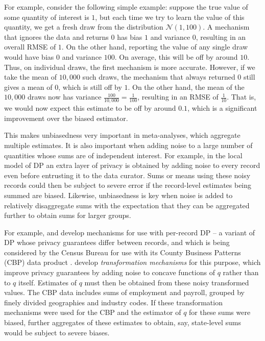 \documentclass[11pt]{article}
\begin{document}
For example, consider the following simple example: suppose the true value of some quantity of interest is $1$, but each time we try to learn the value of this quantity, we get a fresh draw from the distribution $\mathcal{N}(1,100)$. A mechanism that ignores the data and returns $0$ has bias $1$ and variance $0$, resulting in an overall RMSE of $1$. On the other hand, reporting the value of any single draw would have bias $0$ and variance $100$. On average, this will be off by around $10$. Thus, on individual draws, the first mechanism is more accurate. However, if we take the mean of $10,000$ such draws, the mechanism that always returned $0$ still gives a mean of $0$, which is still off by $1$. On the other hand, the mean of the $10,000$ draws now has variance $\frac{100}{10,000} = \frac{1}{100}$, resulting in an RMSE of $\frac{1}{10}$. That is, we would now expect this estimate to be off by around $0.1$, which is a significant improvement over the biased estimator.

This makes unbiasedness very important in meta-analyses, which aggregate multiple estimates. It is also important when adding noise to a large number of quantities whose sums are of independent interest. For example, in the local model of DP an extra layer of privacy is obtained by adding noise to every record even before entrusting it to the data curator. Sums or means using these noisy records could then be subject to severe error if the record-level estimates being summed are biased. Likewise, unbiasedness is key when noise is added to relatively disaggregate sums with the expectation that they can be aggregated further to obtain sums for larger groups. 


For example, \cite{seemanEtAl2024} and \cite{finleyEtAl2024} develop mechanisms for use with per-record DP -- a variant of DP whose privacy guarantees differ between records, and which is being considered by the Census Bureau for use with its County Business Patterns (CBP) data product \cite{BeckomEtAl2023}. \cite{finleyEtAl2024} develop \textit{transformation mechanisms} for this purpose, which improve privacy guarantees by adding noise to concave functions of $q$ rather than to $q$ itself. Estimates of $q$ must then be obtained from these noisy transformed values. The CBP data includes sums of employment and payroll, grouped by finely divided geographies and industry codes. If these transformation mechanisms were used for the CBP and the estimator of $q$ for these sums were biased, further aggregates of these estimates to obtain, say, state-level sums would be subject to severe biases.
\end{document}
